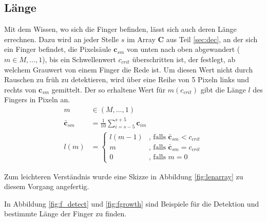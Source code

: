 \subsection{Länge}
\label{sec:lan}
Mit dem Wissen, wo sich die Finger befinden, lässt sich auch deren Länge errechnen. Dazu wird an jeder Stelle $s$ im Array $\mathbf{C}$ aus Teil \ref{sec:dec}, an der sich ein Finger befindet, die Pixelsäule $\mathbf{c}_{sm}$ von unten nach oben abgewandert ($m \in M, \dots, 1$), bis ein Schwellenwert $c_{crit}$ überschritten ist, der festlegt, ab welchem Grauwert von einem Finger die Rede ist. Um diesen Wert nicht durch Rauschen zu früh zu detektieren, wird über eine Reihe von 5 Pixeln links und rechts von $\mathbf{c}_{sm}$ gemittelt. Der so erhaltene Wert für $m(c_{crit})$ gibt die Länge $l$ des Fingers in Pixeln an.
\begin{equation}
\begin{aligned}
 m &\in (M,\dots,1) \\
 \bar{\mathbf{c}}_{sm} &= \frac{1}{10}\sum_{i=s-5}^{s+5} \mathbf{c}_{im} \\
 l(m) &=   \begin{cases}
	    l(m-1) & \text{, falls } \bar{\mathbf{c}}_{sm} < c_{crit}  \\
	    m      & \text{, falls } \bar{\mathbf{c}}_{sm} = c_{crit}  \\
	    0      & \text{, falls } m=0
	   \end{cases}
\end{aligned}
\end{equation}

Zum leichteren Verständnis wurde eine Skizze in Abbildung \ref{fig:lenarray} zu diesem Vorgang angefertig.
 
In Abbildung \ref{fig:f_detect} und \ref{fig:fgrowth} sind Beispiele für die Detektion und bestimmte Länge der Finger zu finden.


